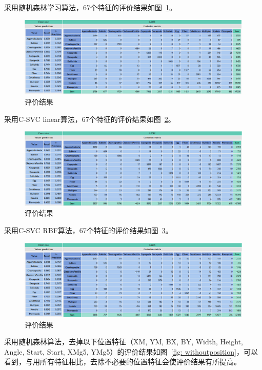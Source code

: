 \documentclass[12pt]{article}
\begin{document}
采用随机森林学习算法，67个特征的评价结果如图~\ref{fig: RandomForest}。

\begin{figure}[!ht]
\centering
\includegraphics[width=1.0\textwidth]{RandomForest.png}
\caption{评价结果}
\label{fig: RandomForest}
\end{figure} 

采用C-SVC linear算法，67个特征的评价结果如图~\ref{fig: C-SVClinear}。

\begin{figure}[!ht]
\centering
\includegraphics[width=1.0\textwidth]{C-SVClinear.png}
\caption{评价结果}
\label{fig: C-SVClinear}
\end{figure} 

采用C-SVC RBF算法，67个特征的评价结果如图~\ref{fig: C-SVC-RBF}。

\begin{figure}[!ht]
\centering
\includegraphics[width=1.0\textwidth]{C-SVC-RBF.png}
\caption{评价结果}
\label{fig: C-SVC-RBF}
\end{figure} 

采用随机森林算法，去掉以下位置特征（XM, YM, BX, BY, Width, Height, Angle, Start, Start, XMg5, YMg5）的评价结果如图~\ref{fig: withoutposition}，可以看到，与用所有特征相比，去除不必要的位置特征会使评价结果有所提高。
\end{document}
